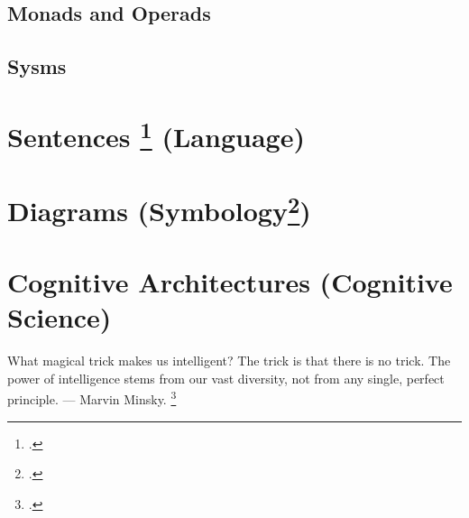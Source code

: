 \documentclass[12pt,a4paper]{article}
\begin{document}
\subsection{Monads and Operads}

\subsection{Sysms}

\section{Sentences \footcite{Carnie2012} (Language)}

\section{Diagrams (Symbology\footcite{Jung1964})} 

\section{Cognitive Architectures (Cognitive Science)}
What magical trick makes us intelligent? The trick is that there is no trick. The power of intelligence stems from our vast diversity, not from any single, perfect principle. — Marvin Minsky. \footcite[308]{Minsky1988}
\end{document}
